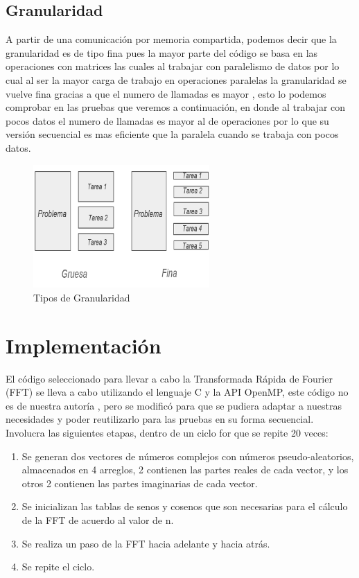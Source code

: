 \documentclass{report}
\begin{document}
\subsection*{Granularidad}

A partir de una comunicación por memoria compartida, podemos decir que la granularidad es de tipo fina pues la mayor parte del código se basa en las operaciones con matrices las cuales al trabajar con paralelismo de datos por lo cual al ser la mayor carga de trabajo en operaciones paralelas la granularidad se vuelve fina gracias a que el numero de llamadas es mayor , esto lo podemos comprobar en las pruebas que veremos a continuación, en donde al trabajar con pocos datos el numero de llamadas es mayor al de operaciones por lo que su versión secuencial es mas eficiente que la paralela cuando se trabaja con pocos datos.


\begin{figure}[h!]
    \centering
    \includegraphics[width=0.6\textwidth]{Images/Granularidad.png}
    \caption{Tipos de Granularidad}
\end{figure}

\clearpage


\section*{Implementación} %
El código seleccionado para llevar a cabo la Transformada Rápida de Fourier (FFT) se lleva a cabo utilizando el lenguaje C y la API OpenMP, este código no es de nuestra autoría \cite{FFT}, pero se modificó para que se pudiera adaptar a nuestras necesidades y poder reutilizarlo para las pruebas en su forma secuencial. Involucra las siguientes etapas, dentro de un ciclo for que se repite 20 veces:\medskip


\begin{enumerate}
    \item Se generan dos vectores de números complejos con números pseudo-aleatorios, almacenados en 4 arreglos, 2 contienen las partes reales de cada vector, y los otros 2 contienen las partes imaginarias de cada vector.
    \item Se inicializan las tablas de senos y cosenos que son necesarias para el cálculo de la FFT de acuerdo al valor de n.
    \item Se realiza un paso de la FFT hacia adelante y hacia atrás.
    \item Se repite el ciclo.
\end{enumerate}
\end{document}
